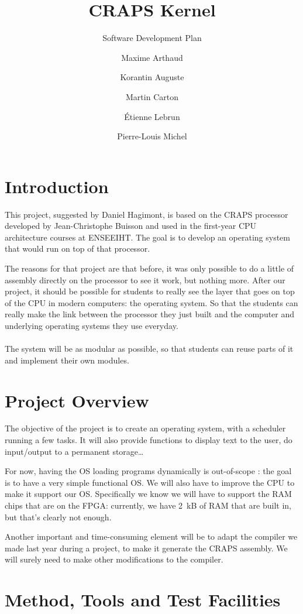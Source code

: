 \documentclass{article}
\title{CRAPS Kernel}
\subtitle{Software Development Plan}
\author{
       Maxime Arthaud
  \and Korantin Auguste
  \and Martin Carton
  \and Étienne Lebrun
  \and Pierre-Louis Michel
}
\begin{document}
  
  \tableofcontents
  \newpage

  \section{Introduction}
    This project, suggested by Daniel Hagimont, is based on the CRAPS processor
    developed by Jean-Christophe Buisson and used in the first-year CPU
    architecture courses at ENSEEIHT. The goal is to develop an operating
    system that would run on top of that processor.

    The reasons for that project are that before, it was only possible to do a
    little of assembly directly on the processor to see it work, but nothing
    more.  After our project, it should be possible for students to really see
    the layer that goes on top of the CPU in modern computers: the operating
    system. So that the students can really make the link between the processor
    they just built and the computer and underlying operating systems they use
    everyday.

    \paragraph{}
    The system will be as modular as possible, so that students can reuse parts
    of it and implement their own modules.

  \section{Project Overview}
    The objective of the project is to create an operating system, with a
    scheduler running a few tasks. It will also provide functions to display
    text to the user, do input/output to a permanent storage\dots

    For now, having the OS loading programs dynamically is out-of-scope : the
    goal is to have a very simple functional OS.  We will also have to improve
    the CPU to make it support our OS. Specifically we know we will have to
    support the RAM chips that are on the FPGA: currently, we have \SI{2}{kB}
    of RAM that are built in, but that's clearly not enough.

    Another important
    and time-consuming element will be to adapt the compiler we made last year
    during a project, to make it generate the CRAPS assembly. We will
    surely need to make other modifications to the compiler.

  \section{Method, Tools and Test Facilities}
\end{document}
